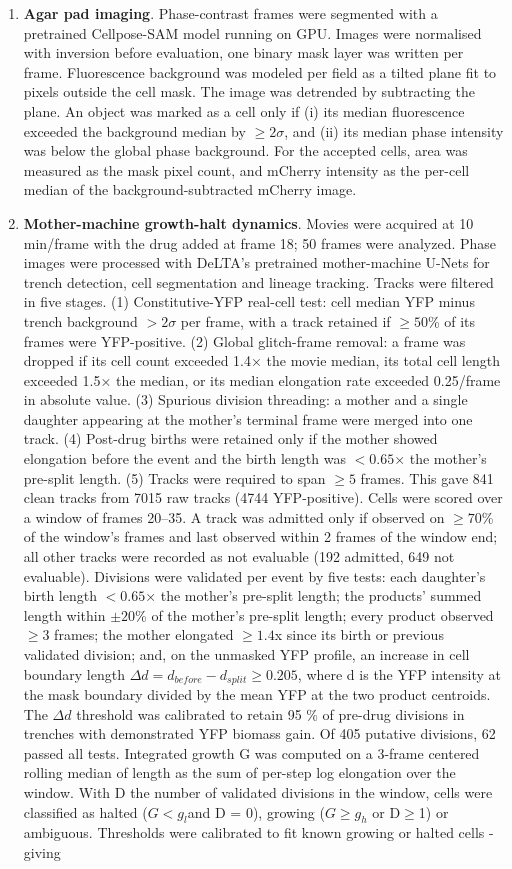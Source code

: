\documentclass[12pt]{article}
\begin{document}
\begin{enumerate}
    \item \textbf{Agar pad imaging}. Phase-contrast frames were segmented with a pretrained Cellpose-SAM model running on GPU. Images were normalised with inversion before evaluation, one binary mask layer was written per frame. Fluorescence background was modeled per field as a tilted plane fit to pixels outside the cell mask. The image was detrended by subtracting the plane. An object was marked as a cell only if (i) its median fluorescence exceeded the background median by $\geq2\sigma$, and (ii) its median phase intensity was below the global phase background. For the accepted cells, area was measured as the mask pixel count, and mCherry intensity as the per-cell median of the background-subtracted mCherry image.
    \item \textbf{Mother-machine growth-halt dynamics}. Movies were acquired at 10 min/frame with the drug added at frame 18; 50 frames were analyzed. Phase images were processed with DeLTA's pretrained mother-machine U-Nets for trench detection, cell segmentation and lineage tracking. Tracks were filtered in five stages. (1) Constitutive-YFP real-cell test: cell median YFP minus trench background $>2\sigma$ per frame, with a track retained if $\geq50$\% of its frames were YFP-positive. (2) Global glitch-frame removal: a frame was dropped if its cell count exceeded 1.4× the movie median, its total cell length exceeded 1.5× the median, or its median elongation rate exceeded 0.25/frame in absolute value. (3) Spurious division threading: a mother and a single daughter appearing at the mother's terminal frame were merged into one track. (4) Post-drug births were retained only if the mother showed elongation before the event and the birth length was $<0.65$× the mother's pre-split length. (5) Tracks were required to span $\geq5$ frames. This gave 841 clean tracks from 7015 raw tracks (4744 YFP-positive). Cells were scored over a window of frames 20–35. A track was admitted only if observed on $\geq70$\% of the window's frames and last observed within 2 frames of the window end; all other tracks were recorded as not evaluable (192 admitted, 649 not evaluable). Divisions were validated per event by five tests: each daughter's birth length $<0.65$× the mother's pre-split length; the products' summed length within $\pm20$\% of the mother's pre-split length; every product observed $\geq3$ frames; the mother elongated $\geq1.4$x since its birth or previous validated division; and, on the unmasked YFP profile, an increase in cell boundary length $\Delta{d} = d_{before}-d_{split}\geq0.205$, where d is the YFP intensity at the mask boundary divided by the mean YFP at the two product centroids. The $\Delta{d}$ threshold was calibrated to retain 95 \% of pre-drug divisions in trenches with demonstrated YFP biomass gain. Of 405 putative divisions, 62 passed all tests. Integrated growth G was computed on a 3-frame centered rolling median of length as the sum of per-step log elongation over the window. With D the number of validated divisions in the window, cells were classified as halted ($G < g_{l}$and D = 0), growing ($G \geq g_{h}$ or D$\geq$1) or ambiguous. Thresholds were calibrated to fit known growing or halted cells - giving 
\end{enumerate}
\end{document}
